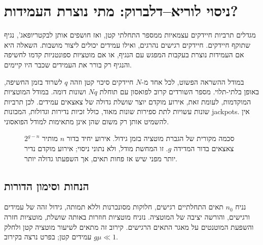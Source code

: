 \section{ניסוי לוריא--דלברוק: מתי נוצרת העמידות?}\label{sec:he03-fluctuation}
מגדלים תרביות חיידקים עצמאיות ממספר התחלתי קטן, ואז חושפים אותן לבקטריופאג', נגיף שתוקף חיידקים. חיידקים רגישים נהרגים, ואילו עמידים יכולים ליצור מושבות. השאלה היא אם העמידות נוצרת בעקבות המפגש עם הנגיף, או אם מוטציות ספונטניות קדמו לחשיפה והנגיף רק בורר את העמידים שכבר היו קיימים.

במודל ההשראה הפשוט, לכל אחד מ-$N$ חיידקים סיכוי קטן וזהה $q$ לשרוד בזמן החשיפה, באופן בלתי-תלוי. מספר השורדים קרוב לפואסון עם תוחלת $Nq$ ושונות דומה. במודל המוטציות המוקדמות, לעומת זאת, אירוע מוקדם יוצר שושלת גדולה של צאצאים עמידים. לכן תרביות שונות עשויות לתת ספירות שונות מאוד, כולל זכיות נדירות וגדולות, המכונות \textenglish{jackpots}. אין להשמיט אותן רק משום שהן אינן מתאימות למודל הפואסוני.

\begin{figure}[htbp]
\centering
\begin{english}
\end{english}
\caption{סכמה מקורית של הגברת מוטציה בזמן גידול. אירוע יחיד בדור $n$ מותיר $2^{g-n}$ צאצאים בדור המדידה $g$. זו המחשת מודל, ולא נתוני ניסוי; אירוע מוקדם נדיר יותר מפני שיש אז פחות תאים, אך השפעתו גדולה יותר.}\label{fig:he03-jackpot}
\end{figure}

\subsection{הנחות וסימון הדורות}\label{sec:he03-generations}
נניח $n_0$ תאים התחלתיים רגישים, חלוקות מסונכרנות וללא תמותה, גידול זהה של עמידים ורגישים, והורשה יציבה של המוטציה. נזניח מוטציות חוזרות באותה שושלת, מוטציות חזרה והשפעת המוטנטים על מאגר התאים הרגישים. קירוב זה מתאים לשיעור מוטציה קטן ולחלק עמידים קטן; בפרט נרצה בקירוב $g\mu\ll1$.

